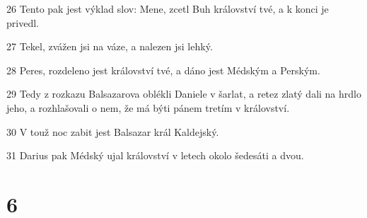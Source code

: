 \par 26 Tento pak jest výklad slov: Mene, zcetl Buh království tvé, a k konci je privedl.
\par 27 Tekel, zvážen jsi na váze, a nalezen jsi lehký.
\par 28 Peres, rozdeleno jest království tvé, a dáno jest Médským a Perským.
\par 29 Tedy z rozkazu Balsazarova oblékli Daniele v šarlat, a retez zlatý dali na hrdlo jeho, a rozhlašovali o nem, že má býti pánem tretím v království.
\par 30 V touž noc zabit jest Balsazar král Kaldejský.
\par 31 Darius pak Médský ujal království v letech okolo šedesáti a dvou.

\chapter{6}

